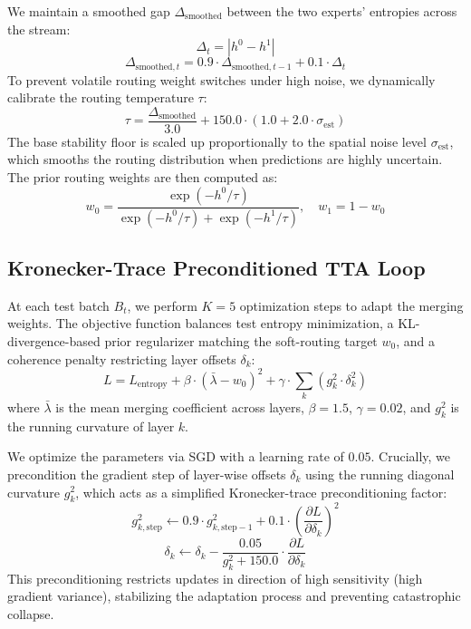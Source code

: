 \documentclass{article}
\theoremstyle{plain}
\theoremstyle{definition}
\theoremstyle{remark}
\begin{document}
We maintain a smoothed gap $\Delta_{\text{smoothed}}$ between the two experts' entropies across the stream:
\begin{equation}
    \Delta_t = |h^0 - h^1|
\end{equation}
\begin{equation}
    \Delta_{\text{smoothed}, t} = 0.9 \cdot \Delta_{\text{smoothed}, t-1} + 0.1 \cdot \Delta_t
\end{equation}
To prevent volatile routing weight switches under high noise, we dynamically calibrate the routing temperature $\tau$:
\begin{equation}
    \tau = \frac{\Delta_{\text{smoothed}}}{3.0} + 150.0 \cdot (1.0 + 2.0 \cdot \sigma_{\text{est}})
\end{equation}
The base stability floor is scaled up proportionally to the spatial noise level $\sigma_{\text{est}}$, which smooths the routing distribution when predictions are highly uncertain.
The prior routing weights are then computed as:
\begin{equation}
    w_0 = \frac{\exp(-h^0 / \tau)}{\exp(-h^0 / \tau) + \exp(-h^1 / \tau)}, \quad w_1 = 1 - w_0
\end{equation}

\subsection{Kronecker-Trace Preconditioned TTA Loop}
At each test batch $B_t$, we perform $K=5$ optimization steps to adapt the merging weights. The objective function balances test entropy minimization, a KL-divergence-based prior regularizer matching the soft-routing target $w_0$, and a coherence penalty restricting layer offsets $\delta_k$:
\begin{equation}
    L = L_{\text{entropy}} + \beta \cdot (\bar{\lambda} - w_0)^2 + \gamma \cdot \sum_k (g_k^2 \cdot \delta_k^2)
\end{equation}
where $\bar{\lambda}$ is the mean merging coefficient across layers, $\beta = 1.5$, $\gamma = 0.02$, and $g_k^2$ is the running curvature of layer $k$.

We optimize the parameters via SGD with a learning rate of $0.05$. Crucially, we precondition the gradient step of layer-wise offsets $\delta_k$ using the running diagonal curvature $g_k^2$, which acts as a simplified Kronecker-trace preconditioning factor:
\begin{equation}
    g_{k, \text{step}}^2 \leftarrow 0.9 \cdot g_{k, \text{step}-1}^2 + 0.1 \cdot \left(\frac{\partial L}{\partial \delta_k}\right)^2
\end{equation}
\begin{equation}
    \delta_k \leftarrow \delta_k - \frac{0.05}{g_k^2 + 150.0} \cdot \frac{\partial L}{\partial \delta_k}
\end{equation}
This preconditioning restricts updates in direction of high sensitivity (high gradient variance), stabilizing the adaptation process and preventing catastrophic collapse.
\end{document}
